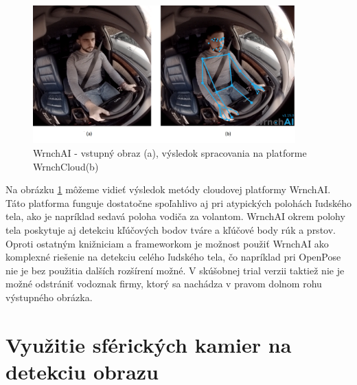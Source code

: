 \documentclass[slovak,master,dept460,male,cpp,cpdeclaration]{diploma}
\begin{document}
\begin{figure}[H]
	\centering
	\includegraphics[width=0.9\textwidth]{Figures/wrnchAI.png}
	\caption{WrnchAI - vstupný obraz (a), výsledok spracovania na platforme WrnchCloud(b)}
	\label{fig:wrnchAICloud}
\end{figure}

Na obrázku \ref{fig:wrnchAICloud} môžeme vidieť výsledok metódy cloudovej platformy WrnchAI. Táto platforma  funguje dostatočne spoľahlivo aj pri atypických polohách ľudského tela, ako je napríklad sedavá poloha vodiča za volantom. WrnchAI okrem polohy tela poskytuje aj detekciu kľúčových bodov tváre a kľúčové body rúk a prstov. Oproti ostatným knižniciam a frameworkom je možnost použiť WrnchAI ako komplexné riešenie na detekciu celého ľudského tela, čo napríklad pri OpenPose nie je bez použitia dalších rozšírení možné. V skúšobnej trial verzii  taktiež nie je možné odstrániť vodoznak firmy, ktorý sa nachádza v pravom dolnom rohu výstupného obrázka.



\newpage
\section{Využitie sférických kamier na detekciu obrazu}
\label{sec:Spherical cameras}
\end{document}
